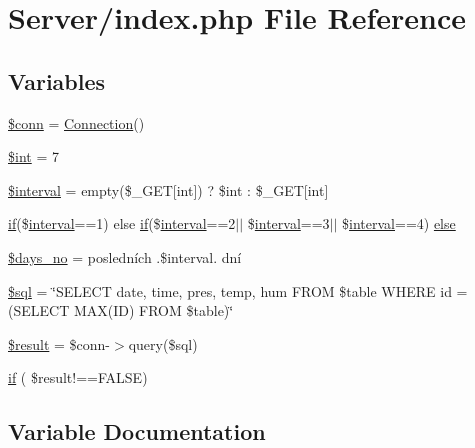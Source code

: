 \hypertarget{index_8php}{}\section{Server/index.php File Reference}
\label{index_8php}
\subsection*{Variables}
\begin{DoxyCompactItemize}
\item 
\hyperlink{index_8php_aa8a5a87b9c1a6a0819b88447cbe41877}{\$conn} = \hyperlink{connect_8php_a346f4774f29e17e14e9b39fa9e2165e3}{Connection}()
\item 
\hyperlink{index_8php_ab1e3f34fd9304146bfc0a8849523080a}{\$int} = 7
\item 
\hyperlink{index_8php_a02df6fd14302ba88fecc15b95d513e5b}{\$interval} = empty(\$\+\_\+\+G\+ET\mbox{[}\textquotesingle{}int\textquotesingle{}\mbox{]}) ? \$int \+: \$\+\_\+\+G\+ET\mbox{[}\textquotesingle{}int\textquotesingle{}\mbox{]}
\item 
\hyperlink{index_8php_a5bd83a7a52ff3be468b16a8c82e43673}{if}(\$\hyperlink{_w_s_8ino_ae0c690118932b32ef40a74bb6a259acd}{interval}==1) else \hyperlink{index_8php_a5bd83a7a52ff3be468b16a8c82e43673}{if}(\$\hyperlink{_w_s_8ino_ae0c690118932b32ef40a74bb6a259acd}{interval}==2$\vert$$\vert$ \$\hyperlink{_w_s_8ino_ae0c690118932b32ef40a74bb6a259acd}{interval}==3$\vert$$\vert$ \$\hyperlink{_w_s_8ino_ae0c690118932b32ef40a74bb6a259acd}{interval}==4) \hyperlink{index_8php_a238fa3f90e3c912d2144c3286fe41bbf}{else}
\item 
\hyperlink{index_8php_a71e392718e830e37a3354e643808a166}{\$days\+\_\+no} = \textquotesingle{} posledních \textquotesingle{}.\$interval.\textquotesingle{} dní\textquotesingle{}
\item 
\hyperlink{index_8php_a047170d6020a882807665812a27e2525}{\$sql} = \char`\"{}S\+E\+L\+E\+CT date, time, pres, temp, hum F\+R\+OM \$table W\+H\+E\+RE id = (S\+E\+L\+E\+CT M\+AX(ID) F\+R\+OM \$table)\char`\"{}
\item 
\hyperlink{index_8php_a112ef069ddc0454086e3d1e6d8d55d07}{\$result} = \$conn-\/$>$query(\$sql)
\item 
\hyperlink{index_8php_a5bd83a7a52ff3be468b16a8c82e43673}{if} ( \$result!==F\+A\+L\+SE)
\end{DoxyCompactItemize}


\subsection{Variable Documentation}
\mbox{\label{index_8php_aa8a5a87b9c1a6a0819b88447cbe41877}} 
